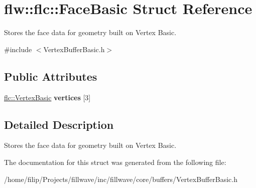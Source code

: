 \hypertarget{structflw_1_1flc_1_1FaceBasic}{}\section{flw\+:\+:flc\+:\+:Face\+Basic Struct Reference}
\label{structflw_1_1flc_1_1FaceBasic}


Stores the face data for geometry built on Vertex Basic.  




{\ttfamily \#include $<$Vertex\+Buffer\+Basic.\+h$>$}

\subsection*{Public Attributes}
\begin{DoxyCompactItemize}
\item 
\hyperlink{structflw_1_1flc_1_1VertexBasic}{flc\+::\+Vertex\+Basic} {\bfseries vertices} \mbox{[}3\mbox{]}\hypertarget{structflw_1_1flc_1_1FaceBasic_a38791ec533656c6001d311132000774b}{}\label{structflw_1_1flc_1_1FaceBasic_a38791ec533656c6001d311132000774b}

\end{DoxyCompactItemize}


\subsection{Detailed Description}
Stores the face data for geometry built on Vertex Basic. 

The documentation for this struct was generated from the following file\+:\begin{DoxyCompactItemize}
\item 
/home/filip/\+Projects/fillwave/inc/fillwave/core/buffers/Vertex\+Buffer\+Basic.\+h\end{DoxyCompactItemize}
